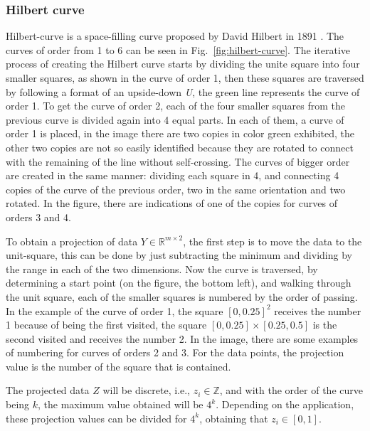 \subsubsection{Hilbert curve}

Hilbert-curve is a space-filling curve proposed by David Hilbert in 1891 \cite{Hubert1891}. The curves of order from 1 to 6 can be seen in Fig.~\ref{fig:hilbert-curve}.
%
The iterative process of creating the Hilbert curve starts by dividing the unite square into four smaller squares, as shown in the curve of order 1,
%
then these squares are traversed by following a format of an upside-down \textit{U},
%
the green line represents the curve of order 1.
%
To get the curve of order 2, each of the four smaller squares from the previous curve is divided again into 4 equal parts.
%
In each of them, a curve of order 1 is placed, 
%
in the image there are two copies in color green exhibited,
%
the other two copies are not so easily identified because they are rotated to connect with the remaining of the line without self-crossing.
%
The curves of bigger order are created in the same manner: dividing each square in 4, and connecting 4 copies of the curve of the previous order, two in the same orientation and two rotated.
%
In the figure, there are indications of one of the copies for curves of orders 3 and 4.
%

To obtain a projection of data $Y \in \mathbb{R}^{m \times 2}$, the first step is to move the data to the unit-square, 
%
this can be done by just subtracting the minimum and dividing by the range in each of the two dimensions.
%
Now the curve is traversed, by determining a start point (on the figure, the bottom left),
%
and walking through the unit square, each of the smaller squares is numbered by the order of passing.
%
In the example of the curve of order 1, the square $[0, 0.25]^2$ receives the number 1 because of being the first visited,
%
the square $[0, 0.25] \times [0.25, 0.5]$ is the second visited and receives the number 2.
%
In the image, there are some examples of numbering for curves of orders 2 and 3.
%
For the data points, the projection value is the number of the square that is contained.
%

The projected data $Z$ will be discrete, i.e., $z_i \in \mathbb{Z}$, and with the order of the curve being $k$, the maximum value obtained will be $4^k$. 
%
Depending on the application, these projection values can be divided for $4^k$, obtaining that $z_i \in [0, 1]$.


